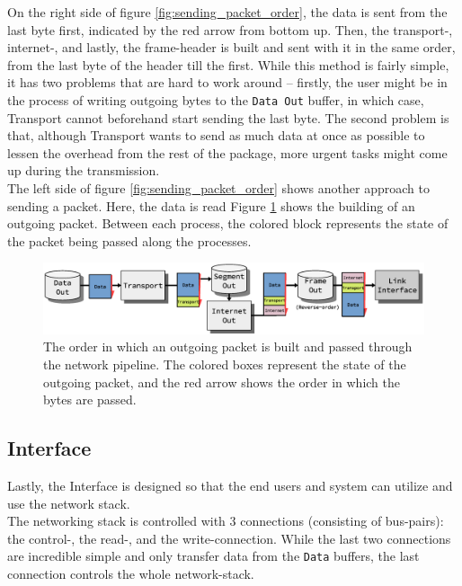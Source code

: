 On the right side of figure \ref{fig:sending_packet_order}, the data is sent 
from the last byte first, indicated by the red arrow from bottom up. Then, the 
transport-, internet-, and lastly, the frame-header is built and sent with it 
in the same order, from the last byte of the header till the first.
While this method is fairly simple, it has two problems that are hard to work
around -- firstly, the user might be in the process of writing outgoing bytes 
to the \texttt{Data Out} buffer, in which case, Transport cannot beforehand 
start sending the last byte. The second problem is that, although Transport 
wants to send as much data at once as possible to lessen the overhead from the 
rest of the package, more urgent tasks might come up during the transmission.\\
The left side of figure \ref{fig:sending_packet_order} shows another approach
to sending a packet. Here, the data is read  
Figure \ref{fig:sending_packet_graph} shows the building of an outgoing packet.
Between each process, the colored block represents the state of the packet 
being passed along the processes.  

\begin{figure}
    \centering
    \includegraphics[scale=0.45]{design/sending_packet_graph.eps}
    \caption{The order in which an outgoing packet is built and passed through the network pipeline.
    The colored boxes represent the state of the outgoing packet, and the red arrow
    shows the order in which the bytes are passed.}
    \label{fig:sending_packet_graph}
\end{figure}



\subsection{Interface}
Lastly, the Interface is designed so that the end users and system can utilize
and use the network stack.\\
The networking stack is controlled with 3 connections (consisting of bus-pairs): 
the control-, the read-, and the write-connection. While the last two connections 
are incredible simple and only transfer data from the \texttt{Data} buffers, 
the last connection controls the whole network-stack.

